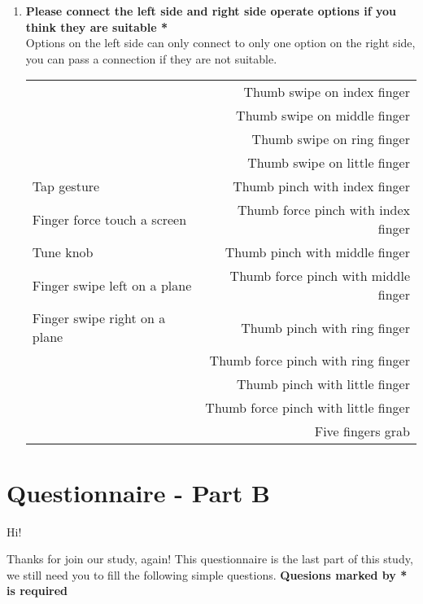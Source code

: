 \begin{enumerate}
      \item \textbf{Please connect the left side and right side operate options if you think they are suitable *}\\
      Options on the left side can only connect to only one option on the right side, you can pass a connection if they are not suitable.

      \begin{tabular}{ l r }
       ~ & Thumb swipe on index finger \\[-3pt]
       ~ & Thumb swipe on middle finger \\[-3pt]
       ~ & Thumb swipe on ring finger \\[-3pt]
       ~ & Thumb swipe on little finger \\[-3pt]
      Tap gesture & Thumb pinch with index finger \\[-3pt]
      Finger force touch a screen & Thumb force pinch with index finger \\[-3pt]
      Tune knob & Thumb pinch with middle finger \\[-3pt]
      Finger swipe left on a plane & Thumb force pinch with middle finger \\[-3pt]
      Finger swipe right on a plane & Thumb pinch with ring finger \\[-3pt]
       ~ & Thumb force pinch with ring finger \\[-3pt]
       ~ & Thumb pinch with little finger \\[-3pt]
       ~ & Thumb force pinch with little finger \\[-3pt]
       ~ & Five fingers grab \\[-3pt]
      \end{tabular}
  \end{enumerate}



  \cleardoublepage


  \chapter{Questionnaire - Part B}
  \label{appendix:c}

  Hi!

  Thanks for join our study, again! This questionnaire is the last part of this study, we still need you to fill the following simple questions.
  \textbf{Quesions marked by * is required}


